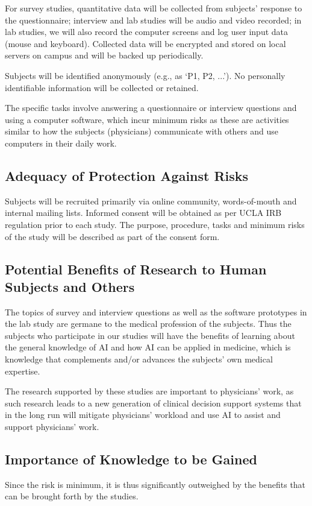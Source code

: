 For survey studies, quantitative data will be collected from subjects' response to the questionnaire; interview and lab studies will be audio and video recorded; in lab studies, we will also record the computer screens and log user input data (\eg mouse and keyboard). Collected data will be encrypted and stored on local servers on campus and will be backed up periodically.

Subjects will be identified anonymously (e.g., as `P1, P2, ...'). No personally identifiable information will be collected or retained.

The specific tasks involve answering a questionnaire or interview questions and using a computer software, which incur minimum risks as these are activities similar to how the subjects (physicians) communicate with others and use computers in their daily work.

\subsection*{Adequacy of Protection Against Risks}\vspace{-1em}
Subjects will be recruited primarily via online community, words-of-mouth and internal mailing lists.
Informed consent will be obtained as per UCLA IRB regulation prior to each study.
The purpose, procedure, tasks and minimum risks of the study will be described as part of the consent form.

\subsection*{Potential Benefits of Research to Human Subjects and Others }\vspace{-1em}
The topics of survey and interview questions as well as the software prototypes in the lab study are germane to the medical profession of the subjects. Thus the subjects who participate in our studies will have the benefits of learning about the general knowledge of AI and how AI can be applied in medicine, which is knowledge that complements and/or advances the subjects' own medical expertise. 

The research supported by these studies are important to physicians' work, as such research leads to a new generation of clinical decision support systems that in the long run will mitigate physicians' workload and use AI to assist and support physicians' work.


\subsection*{Importance of Knowledge to be Gained}\vspace{-1em}
Since the risk is minimum, it is thus significantly outweighed by the benefits that can be brought forth by the studies.